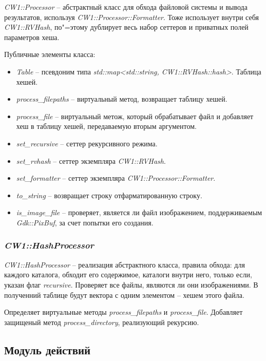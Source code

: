\textit{CW1::Processor} -- абстрактный класс для обхода файловой системы и
вывода результатов, используя \textit{CW1::Processor::Formatter}. Тоже
использует внутри себя \textit{CW1::RVHash}, по"=этому дублирует весь набор
сеттеров и приватных полей параметров хеша.

Публичные элементы класса:

\begin{itemize}
    \item \textit{Table} -- псевдоним типа \textit{std::map<std::string,
          CW1::RVHash::hash>}. Таблица хешей.
    \item \textit{process\_filepaths} -- виртуальный метод, возвращает
          таблицу хешей.
    \item \textit{process\_file} -- виртуальный метож, который обрабатывает
          файл и добавляет хеш в таблицу хешей, передаваемую вторым аргументом.
    \item \textit{set\_recursive} -- сеттер рекурсивного режима.
    \item \textit{set\_rvhash} -- сеттер экземпляра \textit{CW1::RVHash}.
    \item \textit{set\_formatter} -- сеттер экземпляра
          \textit{CW1::Processor::Formatter}.
    \item \textit{to\_string} -- возвращает строку отфарматированную строку.
    \item \textit{is\_image\_file} -- проверяет, является ли файл изображением,
          поддерживаемым \textit{Gdk::PixBuf}, за счет попытки его создания.
\end{itemize}

\subsubsection{\textit{CW1::HashProcessor}}

\textit{CW1::HashProcessor} -- реализация абстрактного класса, правила обхода:
для каждого каталога, обходит его содержимое, каталоги внутри него, только если,
указан флаг \textit{recursive}. Проверяет все файлы, являются ли они
изображениями. В полученний таблице будут вектора с одним элементом -- хешем
этого файла.

Определяет виртуальные методы \textit{process\_filepaths} и
\textit{process\_file}. Добавляет защищеный метод \textit{process\_directory},
реализующий рекурсию.

\subsection*{Модуль действий}

